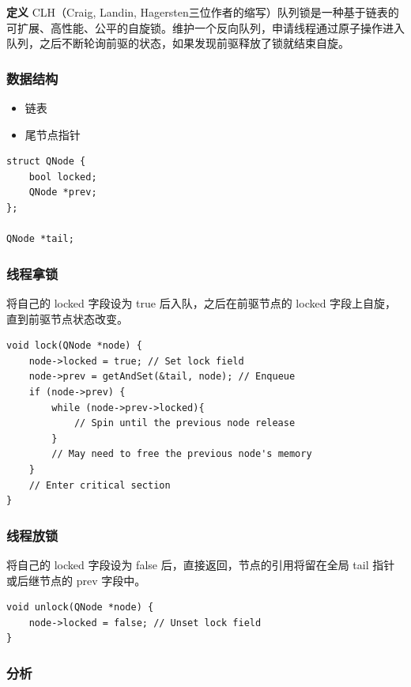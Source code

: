 \documentclass[UTF8]{ctexart}
\begin{document}
\textbf{定义} CLH（Craig, Landin, Hagersten三位作者的缩写）队列锁是一种基于链表的可扩展、高性能、公平的自旋锁。维护一个反向队列，申请线程通过原子操作进入队列，之后不断轮询前驱的状态，如果发现前驱释放了锁就结束自旋。

\subsubsection{数据结构}
\begin{itemize}
    \item 链表
    \item 尾节点指针
\end{itemize}

\begin{lstlisting}
struct QNode {
    bool locked;
    QNode *prev;
};

QNode *tail;
\end{lstlisting}

\subsubsection{线程拿锁}

将自己的 locked 字段设为 true 后入队，之后在前驱节点的 locked 字段上自旋，直到前驱节点状态改变。

\begin{lstlisting}
void lock(QNode *node) {
    node->locked = true; // Set lock field
    node->prev = getAndSet(&tail, node); // Enqueue
    if (node->prev) {
        while (node->prev->locked){
            // Spin until the previous node release
        }
        // May need to free the previous node's memory
    }
    // Enter critical section
}
\end{lstlisting}

\subsubsection{线程放锁}

将自己的 locked 字段设为 false 后，直接返回，节点的引用将留在全局 tail 指针或后继节点的 prev 字段中。

\begin{lstlisting}
void unlock(QNode *node) {
    node->locked = false; // Unset lock field
}
\end{lstlisting}

\subsubsection{分析}
\end{document}
